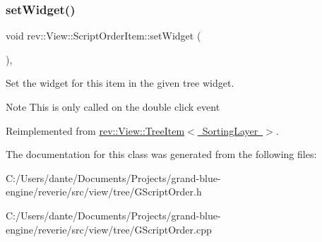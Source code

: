 \subsubsection{\texorpdfstring{setWidget()}{setWidget()}}
{\footnotesize\ttfamily void rev\+::\+View\+::\+Script\+Order\+Item\+::set\+Widget (\begin{DoxyParamCaption}{ }\end{DoxyParamCaption})\hspace{0.3cm}{\ttfamily [override]}, {\ttfamily [virtual]}}



Set the widget for this item in the given tree widget. 

\begin{DoxyNote}{Note}
This is only called on the double click event 
\end{DoxyNote}


Reimplemented from \mbox{\hyperlink{classrev_1_1_view_1_1_tree_item_a24faa4e374ec0728c7eda8f50ca575df}{rev\+::\+View\+::\+Tree\+Item$<$ Sorting\+Layer $>$}}.



The documentation for this class was generated from the following files\+:\begin{DoxyCompactItemize}
\item 
C\+:/\+Users/dante/\+Documents/\+Projects/grand-\/blue-\/engine/reverie/src/view/tree/G\+Script\+Order.\+h\item 
C\+:/\+Users/dante/\+Documents/\+Projects/grand-\/blue-\/engine/reverie/src/view/tree/G\+Script\+Order.\+cpp\end{DoxyCompactItemize}
